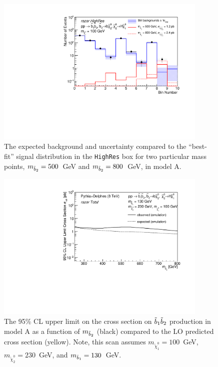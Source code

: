 
\begin{figure}[htb]\centering
\includegraphics[width=0.9\textwidth]{figs/pheno/obsexp_T21bH_HighRes.pdf}
\caption{\label{fig:T21bHExpObs500800} The expected background and
  uncertainty compared to the ``best-fit'' signal distribution in the \texttt{HighRes} box for two particular
  mass points, $m_{\tilde{b}_2}=500$~GeV and $m_{\tilde{b}_2}=800$~GeV, in model A.}
\end{figure}

\begin{figure}[htb]
\includegraphics[width=0.9\textwidth]{figs/pheno/xsecUL_T21bH_130_100_Total.pdf}
\caption{\label{fig:T21bH1dLimit} The 95\% CL upper limit on the
  cross section on $\tilde{b}_1\tilde{b}_2$ production in model A as a function of $m_{\tilde{b}_2}$ (black) compared
  to the LO predicted cross section (yellow). Note, this scan assumes
  $m_{\tilde\chi_1^0}=100$~GeV, $m_{\tilde{\chi}_2^0}=230$~GeV, and  $m_{\tilde{b}_1}=130$~GeV.}
\end{figure}


